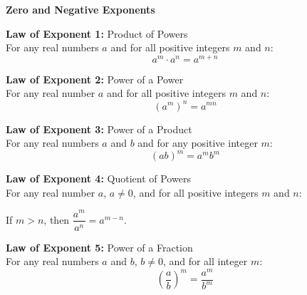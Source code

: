 \begin{center}
\textbf{Zero and Negative Exponents}
\end{center}

\vspace*{1ex}

\textbf{Law of Exponent 1:} Product of Powers\\
For any real numbers $a$ and for all positive integers $m$ and $n$:\\
$$a^m \cdot a^n=a^{m +n}$$


\textbf{Law of Exponent 2:} Power of a Power\\
For any real number $a$ and for all positive integers $m$ and $n$:\\
$$(a^m)^n = a^{mn}$$


\textbf{Law of Exponent 3:} Power of a Product\\
For any real numbers $a$ and $b$ and for any positive integer $m$:
$$(ab)^m= a^mb^m$$


\textbf{Law of Exponent 4:} Quotient of Powers\\
For any real number $a$, $a \neq 0$, and for all positive integers $m$ and $n$:\\
\begin{center}
If $m>n$, then $\dfrac{a^m}{a^n} = a^{m-n}$. 
\end{center} 


\textbf{Law of Exponent 5:} Power of a Fraction\\
For any real numbers $a$ and $b$, $b\neq 0$, and for all integer $m$:\\
$$\left( \dfrac{a}{b}\right)^m = \dfrac{a^m}{b^m}  $$

